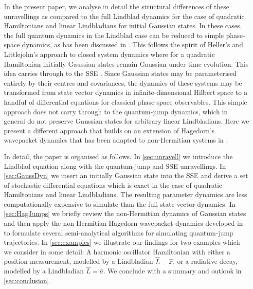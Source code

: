 \documentclass[12pt]{iopart} %
\begin{document}
In the present paper, we analyse in detail the structural differences of these unravellings as compared to the full Lindblad dynamics for the case of quadratic Hamiltonians and linear Lindbladians for initial Gaussian states. In these cases, the full quantum dynamics in the Lindblad case can be reduced to simple phase-space dynamics, as has been discussed in \cite{Brodier2004,graefebradley}. This follows the spirit of Heller's and Littlejohn's approach to closed system dynamics \cite{hellersemi,littlejohn1986semiclassical} where for a quadratic Hamiltonian initially Gaussian states remain Gaussian under time evolution. This idea carries through to the SSE \cite{strunz1998classical,halliwell1995quantum,verstraelen2018gaussian}. Since Gaussian states may be parameterised entirely by their centres and covariances, the dynamics of these systems may be transformed from state vector dynamics in infinite-dimensional Hilbert space to a handful of differential equations for classical phase-space observables. This simple approach does not carry through to the quantum-jump dynamics, which in general do not preserve Gaussian states for arbitrary linear Lindbladians. Here we present a different approach that builds on an extension of Hagedorn's wavepacket dynamics \cite{hagedorn1998raising}  that has been adapted to non-Hermitian systems in \cite{lasser2018non}. 

In detail, the paper is organised as follows. In \cref{sec:unravell} we introduce the Lindblad equation along with the quantum-jump and SSE unravellings. In \cref{sec:GaussDyn} we insert an initially Gaussian state into the SSE and derive a set of stochastic differential equations which is exact in the case of quadratic Hamiltonians and linear Lindbladians. The resulting parameter dynamics are less computationally expensive to simulate than the full state vector dynamics. In \cref{sec:HagJumps} we briefly review the non-Hermitian dynamics of Gaussian states and then apply the non-Hermitian Hagedorn wavepacket dynamics developed in \cite{lasser2018non} to formulate several semi-analytical algorithms for simulating quantum-jump trajectories. In \cref{sec:examples} we illustrate our findings for two examples which we consider in some detail: A harmonic oscillator Hamiltonian with either a position measurement, modelled by a Lindbladian $\hat L=\hat x$, or a radiative decay, modelled by a Lindbladian $\hat L=\hat a$.  We conclude with a summary and outlook in \cref{sec:conclusion}.
\end{document}
